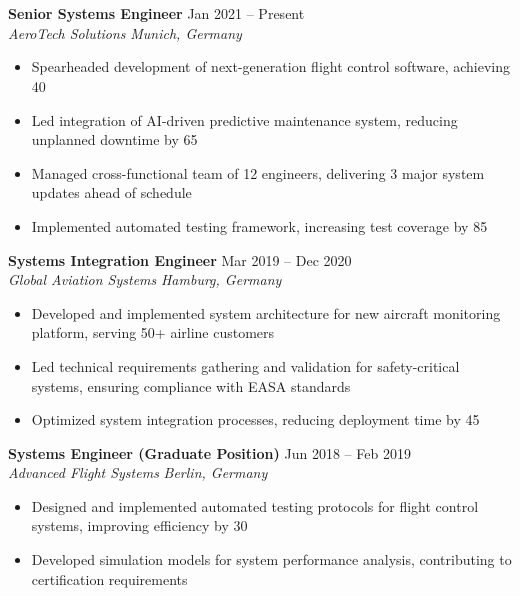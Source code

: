 \documentclass[9pt]{article}        %
\begin{document}
\section*{{\fontsize{12}{14.4}\selectfont{}}{\fontsize{9}{10.8}\selectfont{}}}
\textbf{Senior Systems Engineer} \hfill {Jan 2021 – Present} \\
\textit{AeroTech Solutions} \hfill \textit{Munich, Germany}
\begin{itemize}
  \item Spearheaded development of next-generation flight control software, achieving 40%
  \item Led integration of AI-driven predictive maintenance system, reducing unplanned downtime by 65%
  \item Managed cross-functional team of 12 engineers, delivering 3 major system updates ahead of schedule
  \item Implemented automated testing framework, increasing test coverage by 85%
\end{itemize}
\vspace{+5pt}

\textbf{Systems Integration Engineer} \hfill {Mar 2019 – Dec 2020}\\
\textit{Global Aviation Systems} \hfill \textit{Hamburg, Germany}
\begin{itemize}
  \item Developed and implemented system architecture for new aircraft monitoring platform, serving 50+ airline customers
  \item Led technical requirements gathering and validation for safety-critical systems, ensuring compliance with EASA standards
  \item Optimized system integration processes, reducing deployment time by 45%
\end{itemize}
\vspace{+5pt}

\textbf{Systems Engineer (Graduate Position)} \hfill {Jun 2018 – Feb 2019}\\
\textit{Advanced Flight Systems} \hfill \textit{Berlin, Germany} 
\begin{itemize}
  \item Designed and implemented automated testing protocols for flight control systems, improving efficiency by 30%
  \item Developed simulation models for system performance analysis, contributing to certification requirements
\end{itemize}
\end{document}
